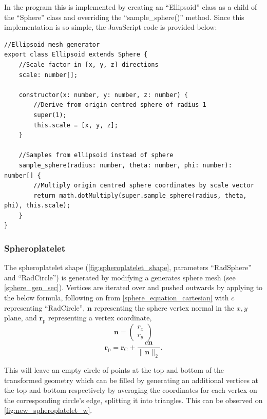 In the program this is implemented by creating an ``Ellipsoid'' class as a child of the ``Sphere'' class and overriding the ``sample\_sphere()'' method. Since this implementation is so simple, the JavaScript code is provided below:

\begin{adjustbox}{width=\textwidth}
\begin{lstlisting}
//Ellipsoid mesh generator
export class Ellipsoid extends Sphere {
    //Scale factor in [x, y, z] directions
    scale: number[];

    constructor(x: number, y: number, z: number) {
        //Derive from origin centred sphere of radius 1
        super(1);
        this.scale = [x, y, z];
    }

    //Samples from ellipsoid instead of sphere
    sample_sphere(radius: number, theta: number, phi: number): number[] {
        //Multiply origin centred sphere coordinates by scale vector
        return math.dotMultiply(super.sample_sphere(radius, theta, phi), this.scale);
    }
}
\end{lstlisting}
\end{adjustbox}

\subsubsection{Spheroplatelet}
The spheroplatelet shape (\cref{fig:spheroplatelet_shape}, parameters ``RadSphere'' and ``RadCircle'') is generated by modifying a generates sphere mesh (see \cref{sphere_gen_sec}). Vertices are iterated over and pushed outwards by applying to the below formula, following on from \cref{sphere_equation_cartesian} with $c$ representing ``RadCircle'', $\mathbf{n}$ representing the sphere vertex normal in the $x,y$ plane, and $\mathbf{r}_\mathrm{p}$ representing a vertex coordinate,
\begin{equation}
\mathbf{n}=\begin{pmatrix}
  r_x\\
  r_y
\end{pmatrix}
\end{equation}
\begin{equation}
\mathbf{r}_\mathrm{p}=\mathbf{r}_\mathrm{C} + \frac{c\mathbf{n}}{\|\mathbf{n}\|_2}.
\end{equation}

This will leave an empty circle of points at the top and bottom of the transformed geometry which can be filled by generating an additional vertices at the top and bottom respectively by averaging the coordinates for each vertex on the corresponding circle's edge, splitting it into triangles. This can be observed on \cref{fig:new_spheroplatelet_w}.

